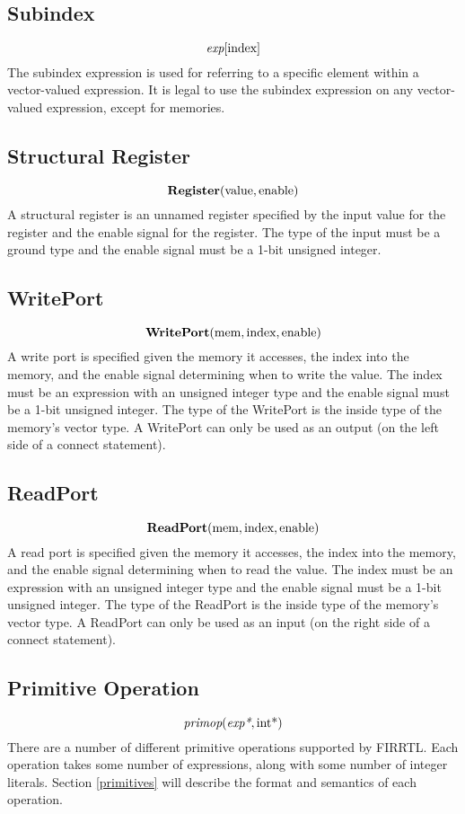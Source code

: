 \documentclass[12pt]{article}
\begin{document}
\subsection{Subindex}
\[
\text{\em exp}[\text{index}]
\]
The subindex expression is used for referring to a specific element within a vector-valued expression.
It is legal to use the subindex expression on any vector-valued expression, except for memories. 

\subsection{Structural Register}
\[
\text{\bf Register}(\text{value}, \text{enable})   
\]
A structural register is an unnamed register specified by the input value for the register and the enable signal for the register.
The type of the input must be a ground type and the enable signal must be a 1-bit unsigned integer. 

\subsection{WritePort}
\[
\text{\bf WritePort}(\text{mem},\text{index},\text{enable})
\]
A write port is specified given the memory it accesses, the index into the memory, and the enable signal determining when to write the value.
The index must be an expression with an unsigned integer type and the enable signal must be a 1-bit unsigned integer. 
The type of the WritePort is the inside type of the memory's vector type.
A WritePort can only be used as an output (on the left side of a connect statement).

\subsection{ReadPort}
\[
\text{\bf ReadPort}(\text{mem},\text{index},\text{enable})
\]
A read port is specified given the memory it accesses, the index into the memory, and the enable signal determining when to read the value.
The index must be an expression with an unsigned integer type and the enable signal must be a 1-bit unsigned integer. 
The type of the ReadPort is the inside type of the memory's vector type.
A ReadPort can only be used as an input (on the right side of a connect statement).

\subsection{Primitive Operation}
\[
\text{\em primop}(\text{\em exp*}, \text{int}\text{*})
\]
There are a number of different primitive operations supported by FIRRTL. 
Each operation takes some number of expressions, along with some number of integer literals.
Section \ref{primitives} will describe the format and semantics of each operation.
\end{document}
